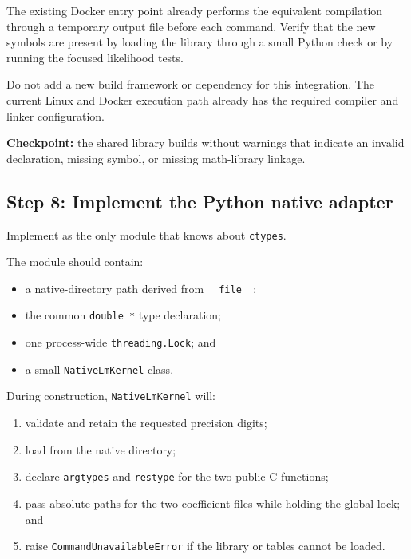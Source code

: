\documentclass[11pt,a4paper]{article}
\begin{document}
The existing Docker entry point already performs the equivalent compilation
through a temporary output file before each command. Verify that the new
symbols are present by loading the library through a small Python check or by
running the focused likelihood tests.

Do not add a new build framework or dependency for this integration. The
current Linux and Docker execution path already has the required compiler and
linker configuration.

\textbf{Checkpoint:} the shared library builds without warnings that indicate
an invalid declaration, missing symbol, or missing math-library linkage.

\subsection{Step 8: Implement the Python native adapter}

Implement  as the only module that
knows about \texttt{ctypes}.

The module should contain:

\begin{itemize}

\item a native-directory path derived from \texttt{\_\_file\_\_};

\item the common \texttt{double *} type declaration;

\item one process-wide \texttt{threading.Lock}; and

\item a small \texttt{NativeLmKernel} class.

\end{itemize}

During construction, \texttt{NativeLmKernel} will:

\begin{enumerate}

\item validate and retain the requested precision digits;

\item load  from the native directory;

\item declare \texttt{argtypes} and \texttt{restype} for the two public C
functions;

\item pass absolute paths for the two coefficient files while holding the
global lock; and

\item raise \texttt{CommandUnavailableError} if the library or tables cannot
be loaded.

\end{enumerate}
\end{document}
